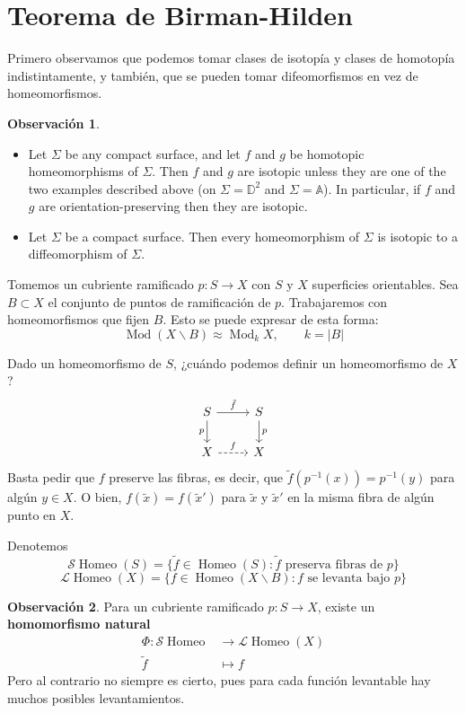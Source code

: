 \documentclass[spanish]{article}
\theoremstyle{definition}
\newtheorem*{obs}{Observación}
\newcommand{\A}{\mathbb{A}}
\newcommand{\D}{\mathbb{D}}
\DeclareMathOperator{\Mod}{Mod}
\DeclareMathOperator{\Homeo}{Homeo}
\begin{document}
\section{Teorema de Birman-Hilden}
Primero observamos que podemos tomar clases de isotopía y clases de homotopía indistintamente, y también, que se pueden tomar difeomorfismos en vez de homeomorfismos.
\begin{obs}\leavevmode
	\begin{itemize}
		\item Let $\Sigma$ be any compact surface, and let $f$ and $g$ be homotopic homeomorphisms of $\Sigma$. Then $f$ and $g$ are isotopic unless they are one of the two examples described above (on $\Sigma = \D^2$ and $\Sigma=\A$). In particular, if $f$ and $g$ are orientation-preserving then they are isotopic.
		\item Let $\Sigma$ be a compact surface. Then every homeomorphism of $\Sigma$ is isotopic to a diffeomorphism of $\Sigma$.
	\end{itemize}
\end{obs}
Tomemos un cubriente ramificado $p:S\to X$ con $S$ y $X$ superficies orientables. Sea $B\subset X$ el conjunto de puntos de ramificación de $p$. Trabajaremos con homeomorfismos que fijen $B$. Esto se puede expresar de esta forma:
\[\Mod(X\backslash B)\approx\Mod_{k}X,\qquad k=|B|\]
	
Dado un homeomorfismo de $S$, ¿cuándo podemos definir un homeomorfismo de $X$?
\[\begin{tikzcd}
	S\arrow[r,"\tilde{f}"]\arrow[d,"p",swap]&S\arrow[d,"p"]\\
	X\arrow[dashed,r,"f"]&X
\end{tikzcd}\]
Basta pedir que $f$ preserve las fibras, es decir, que $\tilde{f}(p^{-1}(x))=p^{-1}(y)$ para algún $y\in X$. O bien, $f(\tilde{x})=f(\tilde{x}')$ para $\tilde{x}$ y $\tilde{x}'$ en la misma fibra de algún punto en $X$.

Denotemos
\[\mathcal{S}\Homeo(S)=\{\tilde{f}\in\Homeo(S):\tilde{f}\text{ preserva fibras de }p\}\]
\[\mathcal{L}\Homeo(X)=\{f\in\Homeo(X\backslash B):f\text{ se levanta bajo }p\}\]
\begin{obs}
	Para un cubriente ramificado $p:S\to X$, existe un \textbf{homomorfismo natural}
	\begin{align*}
		\Phi:\mathcal{S}\Homeo&\to\mathcal{L}\Homeo(X)\\
		\tilde{f}&\mapsto f
	\end{align*}
	Pero al contrario no siempre es cierto, pues para cada función levantable hay muchos posibles levantamientos.
\end{obs}
\end{document}
